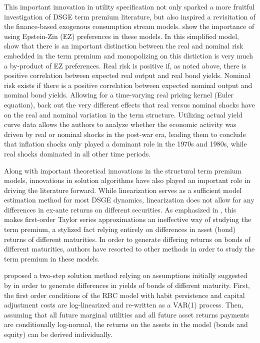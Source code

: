 \documentclass{article}
\numberwithin{equation}{section}
\begin{document}
This important innovation in utility specification not only sparked a more
fruitful investigation of DSGE term premium literature, but also inspired
a revisitation of the finance-based exogenous consumption stream models.
\citet{piazzesischneider2007} show the importance of using Epstein-Zin (EZ)
preferences in these models. In this simplified model,
\citeauthor{piazzesischneider2007} show that there is an important distinction
between the real and nominal risk embedded in the term premium and monopolizing
on this distiction is very much a by-product of EZ preferences. Real risk is
positive if, as noted above, there is positive correlation between expected
real output and real bond yields. Nominal risk exists if there is a positive
correlation between expected nominal output and nominal bond yields. Allowing
for a time-varying real pricing kernel (Euler equation),
\citeauthor{piazzesischneider2007} back out the very different effects that
real versus nominal shocks have on the real and nominal variation in the term
structure. Utilizing actual yield curve data allows the authors to analyze
whether the economic activity was driven by real or nominal shocks in the
post-war era, leading them to conclude that inflation shocks only played
a dominant role in the 1970s and 1980s, while real shocks dominated in all
other time periods.

Along with important theoretical innovations in the structural term premium
models, innovations in solution algorithms have also played an important role
in driving the literature forward. While linearization serves as a sufficient
model estimation method for most DSGE dynamics, linearization does not allow
for any differences in ex-ante returns on different securities. As emphasized
in \citet{jermann1998}, this makes first-order Taylor series approximations an
ineffective way of studying the term premium, a stylized fact relying entirely
on differences in asset (bond) returns of different maturities. In order to
generate differing returns on bonds of different maturities, authors have
resorted to other methods in order to study the term premium in these models.

\citet{jermann1998} proposed a two-step solution method relying on assumptions
initially suggested by \citet{hansensingleton1983} in order to generate
differences in yields of bonds of different maturity. First, the first order
conditions of the RBC model with habit persistence and capital adjustment costs
are log-linearized and re-written as a VAR(1) process. Then, assuming that all
future marginal utilities and all future asset returns payments are
conditionally log-normal, the returns on the assets in the model (bonds and
equity) can be derived individually.
\end{document}
